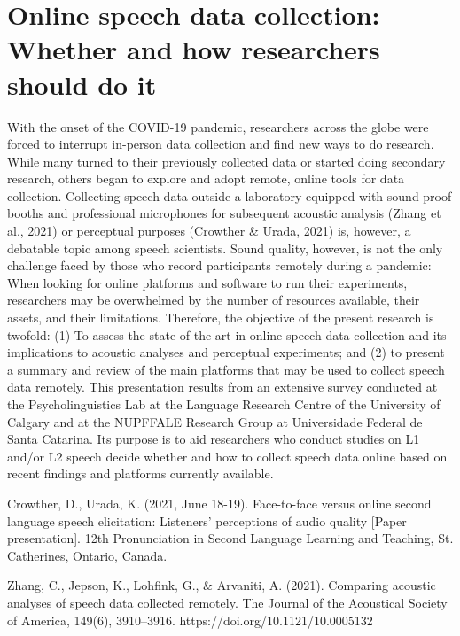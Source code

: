 \chapter{Online speech data collection: Whether and how researchers should do it}\label{ch:cesartelo33}
\begin{affils}
\end{affils}

With the onset of the COVID-19 pandemic, researchers across the globe were forced to interrupt in-person data collection and find new ways to do research. While many turned to their previously collected data or started doing secondary research, others began to explore and adopt remote, online tools for data collection. Collecting speech data outside a laboratory equipped with sound-proof booths and professional microphones for subsequent acoustic analysis (Zhang et al., 2021) or perceptual purposes (Crowther \& Urada, 2021) is, however, a debatable topic among speech scientists. Sound quality, however, is not the only challenge faced by those who record participants remotely during a pandemic: When looking for online platforms and software to run their experiments, researchers may be overwhelmed by the number of resources available, their assets, and their limitations.
Therefore, the objective of the present research is twofold: (1) To assess the state of the art in online speech data collection and its implications to acoustic analyses and perceptual experiments; and (2) to present a summary and review of the main platforms that may be used to collect speech data remotely. This presentation results from an extensive survey conducted at the Psycholinguistics Lab at the Language Research Centre of the University of Calgary and at the NUPFFALE Research Group at Universidade Federal de Santa Catarina. Its purpose is to aid researchers who conduct studies on L1 and/or L2 speech decide whether and how to collect speech data online based on recent findings and platforms currently available.

Crowther, D., Urada, K. (2021, June 18-19). Face-to-face versus online second language speech elicitation: Listeners’ perceptions of audio quality [Paper presentation]. 12th Pronunciation in Second Language Learning and Teaching, St. Catherines, Ontario, Canada.

Zhang, C., Jepson, K., Lohfink, G., \& Arvaniti, A. (2021). Comparing acoustic analyses of speech data collected remotely. The Journal of the Acoustical Society of America, 149(6), 3910–3916. https://doi.org/10.1121/10.0005132

